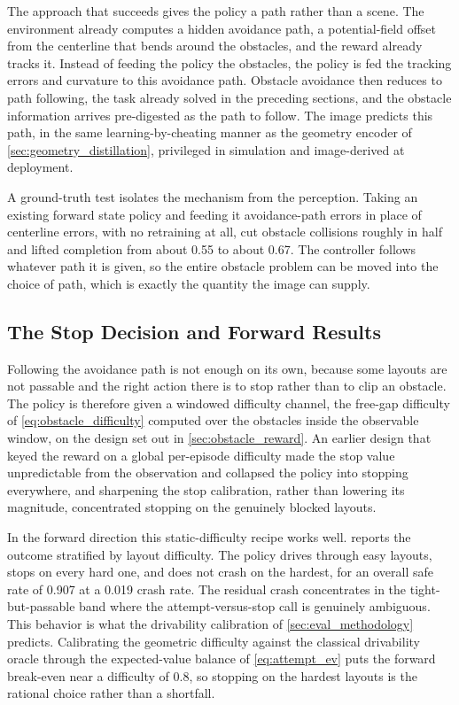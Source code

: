 The approach that succeeds gives the policy a path rather than a scene. The environment already computes a hidden avoidance path, a potential-field offset from the centerline that bends around the obstacles, and the reward already tracks it. Instead of feeding the policy the obstacles, the policy is fed the tracking errors and curvature to this avoidance path. Obstacle avoidance then reduces to path following, the task already solved in the preceding sections, and the obstacle information arrives pre-digested as the path to follow. The image predicts this path, in the same learning-by-cheating manner as the geometry encoder of \cref{sec:geometry_distillation}, privileged in simulation and image-derived at deployment.

A ground-truth test isolates the mechanism from the perception. Taking an existing forward state policy and feeding it avoidance-path errors in place of centerline errors, with no retraining at all, cut obstacle collisions roughly in half and lifted completion from about 0.55 to about 0.67. The controller follows whatever path it is given, so the entire obstacle problem can be moved into the choice of path, which is exactly the quantity the image can supply.

\subsection{The Stop Decision and Forward Results}

Following the avoidance path is not enough on its own, because some layouts are not passable and the right action there is to stop rather than to clip an obstacle. The policy is therefore given a windowed difficulty channel, the free-gap difficulty of \cref{eq:obstacle_difficulty} computed over the obstacles inside the observable window, on the design set out in \cref{sec:obstacle_reward}. An earlier design that keyed the reward on a global per-episode difficulty made the stop value unpredictable from the observation and collapsed the policy into stopping everywhere, and sharpening the stop calibration, rather than lowering its magnitude, concentrated stopping on the genuinely blocked layouts.

In the forward direction this static-difficulty recipe works well.  reports the outcome stratified by layout difficulty. The policy drives through easy layouts, stops on every hard one, and does not crash on the hardest, for an overall safe rate of 0.907 at a 0.019 crash rate. The residual crash concentrates in the tight-but-passable band where the attempt-versus-stop call is genuinely ambiguous. This behavior is what the drivability calibration of \cref{sec:eval_methodology} predicts. Calibrating the geometric difficulty against the classical drivability oracle through the expected-value balance of \cref{eq:attempt_ev} puts the forward break-even near a difficulty of $0.8$, so stopping on the hardest layouts is the rational choice rather than a shortfall.

